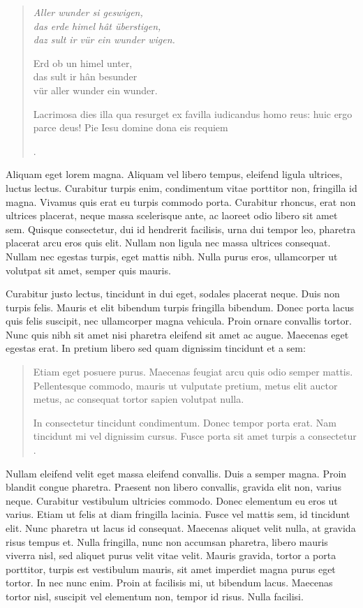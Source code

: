 \documentclass[12pt]{article}
\begin{document}
\begin{mla}
\begin{verse}
    {\em
    Aller wunder si geswigen, \\
    das erde himel hât überstigen, \\
    daz sult ir vür ein wunder wigen.
    
    Erd ob un himel unter, \\
    das sult ir hân besunder \\
    vür aller wunder ein wunder.
    
    Lacrimosa dies illa
    qua resurget ex favilla
    iudicandus homo reus:
    huic ergo parce deus!
    Pie Iesu domine
    dona eis requiem} \Autocite[15]{asi52}.
\end{verse}

Aliquam eget lorem magna. Aliquam vel libero tempus, eleifend ligula ultrices, luctus lectus. Curabitur turpis enim, condimentum vitae porttitor non, fringilla id magna. Vivamus quis erat eu turpis commodo porta. Curabitur rhoncus, erat non ultrices placerat, neque massa scelerisque ante, ac laoreet odio libero sit amet sem. Quisque consectetur, dui id hendrerit facilisis, urna dui tempor leo, pharetra placerat arcu eros quis elit. Nullam non ligula nec massa ultrices consequat. Nullam nec egestas turpis, eget mattis nibh. Nulla purus eros, ullamcorper ut volutpat sit amet, semper quis mauris.

Curabitur justo lectus, tincidunt in dui eget, sodales placerat neque. Duis non turpis felis. Mauris et elit bibendum turpis fringilla bibendum. Donec porta lacus quis felis suscipit, nec ullamcorper magna vehicula. Proin ornare convallis tortor. Nunc quis nibh sit amet nisi pharetra eleifend sit amet ac augue. Maecenas eget egestas erat. In pretium libero sed quam dignissim tincidunt et a sem:

\begin{quotation}
    Etiam eget posuere purus.
    Maecenas feugiat arcu quis odio semper mattis.
    Pellentesque commodo, mauris ut vulputate pretium, metus elit auctor metus, ac consequat tortor sapien volutpat nulla.
    
    In consectetur tincidunt condimentum.
    Donec tempor porta erat.
    Nam tincidunt mi vel dignissim cursus.
    Fusce porta sit amet turpis a consectetur \Autocite[154]{asi53}.
\end{quotation}

\noindent
Nullam eleifend velit eget massa eleifend convallis. Duis a semper magna. Proin blandit congue pharetra. Praesent non libero convallis, gravida elit non, varius neque. Curabitur vestibulum ultricies commodo. Donec elementum eu eros ut varius. Etiam ut felis at diam fringilla lacinia. Fusce vel mattis sem, id tincidunt elit. Nunc pharetra ut lacus id consequat. Maecenas aliquet velit nulla, at gravida risus tempus et. Nulla fringilla, nunc non accumsan pharetra, libero mauris viverra nisl, sed aliquet purus velit vitae velit. Mauris gravida, tortor a porta porttitor, turpis est vestibulum mauris, sit amet imperdiet magna purus eget tortor. In nec nunc enim. Proin at facilisis mi, ut bibendum lacus. Maecenas tortor nisl, suscipit vel elementum non, tempor id risus. Nulla facilisi.


\end{mla}
\end{document}
